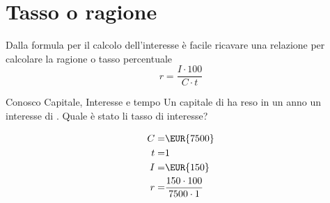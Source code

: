 \section{Tasso o ragione}
Dalla formula per il calcolo dell'interesse è facile ricavare una relazione per calcolare la ragione o tasso percentuale
\[r=\dfrac{I\cdot 100}{C\cdot t}\]
	\begin{esempiot}{Conosco Capitale, Interesse e tempo}{}
	Un capitale di  ha reso in un anno un interesse di . Quale è stato li tasso di interesse?
\end{esempiot}
\begin{align*}
	C=&\mbox{\EUR{7500}}\\
	t=&1\\
	I=&\mbox{\EUR{150}}\\
	r=&\dfrac{150\cdot 100}{7500\cdot 1}\\
\end{align*}